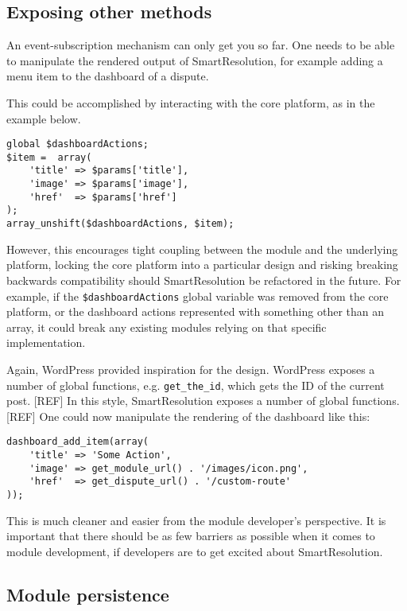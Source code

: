\subsection{Exposing other methods}

An event-subscription mechanism can only get you so far. One needs to be able to manipulate the rendered output of SmartResolution, for example adding a menu item to the dashboard of a dispute.

This could be accomplished by interacting with the core platform, as in the example below.

\begin{lstlisting}
global $dashboardActions;
$item =  array(
    'title' => $params['title'],
    'image' => $params['image'],
    'href'  => $params['href']
);
array_unshift($dashboardActions, $item);
\end{lstlisting}

However, this encourages tight coupling between the module and the underlying platform, locking the core platform into a particular design and risking breaking backwards compatibility should SmartResolution be refactored in the future. For example, if the \lstinline{$dashboardActions} global variable was removed from the core platform, or the dashboard actions represented with something other than an array, it could break any existing modules relying on that specific implementation.

Again, WordPress provided inspiration for the design. WordPress exposes a number of global functions, e.g. \lstinline{get_the_id}, which gets the ID of the current post. [REF] In this style, SmartResolution exposes a number of global functions. [REF] One could now manipulate the rendering of the dashboard like this: %

\begin{lstlisting}
dashboard_add_item(array(
    'title' => 'Some Action',
    'image' => get_module_url() . '/images/icon.png',
    'href'  => get_dispute_url() . '/custom-route'
));
\end{lstlisting}

This is much cleaner and easier from the module developer's perspective. It is important that there should be as few barriers as possible when it comes to module development, if developers are to get excited about SmartResolution.

\subsection{Module persistence}

